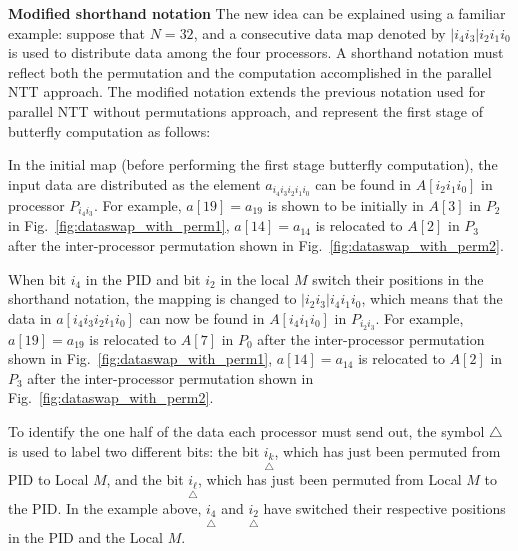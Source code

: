 \documentclass[submission]{iacrtrans}
\theoremstyle{plain}
\begin{document}
\textbf{Modified shorthand notation} The new idea can be explained using a familiar example: suppose that $N=32$, and a consecutive data map denoted by $|i_4i_3|i_2i_1i_0$ is used to distribute data among
the four processors. A shorthand notation must reflect both the permutation and the computation accomplished in the parallel NTT approach. The modified notation extends the previous notation used for parallel NTT without permutations approach, and represent the first stage of butterfly computation as follows:

\begin{table}[h!]\begin{center}
\end{center}\end{table}

In the initial map (before performing the first stage butterfly computation), the input data are distributed as the element $a_{i_4i_3i_2i_1i_0}$ can be found in $A[i_2i_1i_0]$ in processor $P_{i_4i_3}$. For example, $a[19]=a_{19}$ is shown to be initially in $A[3]$ in $P_2$ in Fig.~\ref{fig:dataswap_with_perm1}, $a[14]=a_{14}$ is relocated to $A[2]$ in $P_3$ after the inter-processor permutation shown in Fig.~\ref{fig:dataswap_with_perm2}.


When bit $i_4$ in the PID and bit $i_2$ in the local $M$ switch their positions in the shorthand notation, the mapping is changed to $|i_2i_3|i_4i_1i_0$, which means that the data in
$a[i_4i_3i_2i_1i_0]$ can now be found in $A[i_4i_1i_0]$ in $P_{i_2i_3}$. For example, $a[19]=a_{19}$ is relocated to $A[7]$ in $P_0$ after the inter-processor permutation shown in Fig.~\ref{fig:dataswap_with_perm1}, $a[14]=a_{14}$ is relocated to $A[2]$ in $P_3$ after the inter-processor permutation shown in Fig.~\ref{fig:dataswap_with_perm2}.


To identify the one half of the data each processor must send out, the symbol $\triangle$ is used to label two different bits: the bit $\underset{\triangle}{i_k}$, which has just been permuted from PID
to Local $M$, and the bit $\underset{\triangle}{i_{\ell}}$, which has just been permuted from Local $M$ to the PID. In the example above, $\underset{\triangle}{i_4}$ and $\underset{\triangle}{i_2}$ have switched their respective positions in the PID and the Local $M$.
\end{document}
